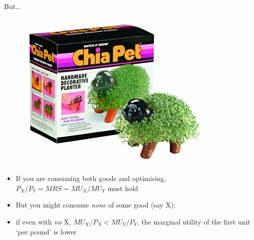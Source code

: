 \documentclass[table]{beamer}
\providecommand{\tightlist}{%
  \setlength{\itemsep}{0pt}\setlength{\parskip}{0pt}}
\begin{document}
\begin{frame}

\begin{block}{But\ldots{}}

\begin{figure}

{\centering \includegraphics[width=0.8\linewidth]{picsfigs/chiapet} 

}

\end{figure}

\end{block}

\end{frame}

\begin{frame}

\begin{itemize}
\tightlist
\item
  If you are consuming both goods and optimising,
  \(P_X/P_Y = MRS = MU_X/MU_Y\) must hold
\end{itemize}

\begin{itemize}[<+->]
\tightlist
\item
  But you might consume \emph{none} of some good (say X):
\end{itemize}

\begin{itemize}[<+->]
\tightlist
\item
  if even with \emph{no} X, \(MU_X/P_X<MU_Y/P_Y\), the marginal utility
  of the first unit `per pound' is lower
\end{itemize}

\end{frame}
\end{document}
